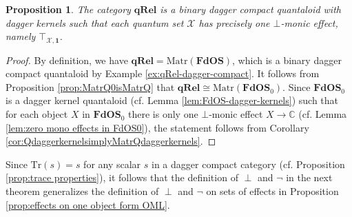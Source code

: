 \documentclass[12pt]{tac}
\newtheorem{proposition}[theorem]{Proposition}
\theoremstyle{definition}
\theoremstyle{remark}
\newcommand{\X}{\mathcal X}
\newcommand{\<}{\langle}
\renewcommand{\>}{\rangle}
\renewcommand{\:}{\colon}
\newcommand{\Tr}{\mathrm{Tr}}
\begin{document}
\begin{proposition}\label{prop:zero mono effects in qRel}\label{prop:qRel is a dagger kernel category}
    The category $\mathbf{qRel}$ is a binary dagger compact quantaloid with dagger kernels such that each quantum set $\X$ has precisely one $\bot$-monic effect, namely $\top_{\X,\mathbf 1}$.
\end{proposition}
\begin{proof}
By definition, we have $\mathbf{qRel}=\mathrm{Matr}(\mathbf{FdOS})$, which is a binary dagger compact quantaloid by Example \ref{ex:qRel-dagger-compact}. It follows from Proposition \ref{prop:MatrQ0isMatrQ} that $\mathbf{qRel}\cong \mathrm{Matr}(\mathbf{FdOS}_0)$. Since $\mathbf{FdOS}_0$ is a dagger kernel quantaloid (cf. Lemma \ref{lem:FdOS-dagger-kernels}) such that for each object $X$ in $\mathbf{FdOS}_0$ there is only one $\bot$-monic effect $X\to\mathbb C$ (cf. Lemma \ref{lem:zero mono effects in FdOS0}), the statement follows from Corollary \ref{cor:QdaggerkernelsimplyMatrQdaggerkernels}.
\end{proof}



Since $\Tr(s)=s$ for any scalar $s$ in a dagger compact category  (cf. Proposition \ref{prop:trace properties}), it follows that the definition of $\perp$ and $\neg$ in the next theorem generalizes the definition of $\perp $ and $\neg$ on sets of effects in Proposition \ref{prop:effects on one object form OML}.
\end{document}
